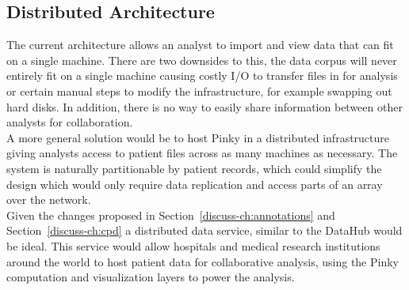 \subsection{Distributed Architecture}\label{discuss-ch:dist-arch}

The current architecture allows an analyst to import and view data that can fit
on a single machine. There are two downsides to this, the data corpus will
never entirely fit on a single machine causing costly I/O to transfer files in
for analysis or certain manual steps to modify the infrastructure, for example
swapping out hard disks. In addition, there is no way to easily share
information between other analysts for collaboration. \\

A more general solution would be to host Pinky in a distributed infrastructure
giving analysts access to patient files across as many machines as necessary.
The system is naturally partitionable by patient records, which could simplify
the design which would only require data replication and access parts of
an array over the network. \\

Given the changes proposed in Section~\ref{discuss-ch:annotations} and
Section~\ref{discuss-ch:cpd} a distributed data service, similar to the
DataHub\cite{datahub} would be ideal.  This service would allow hospitals and
medical research institutions around the world to host patient data for
collaborative analysis, using the Pinky computation and visualization layers to
power the analysis.

